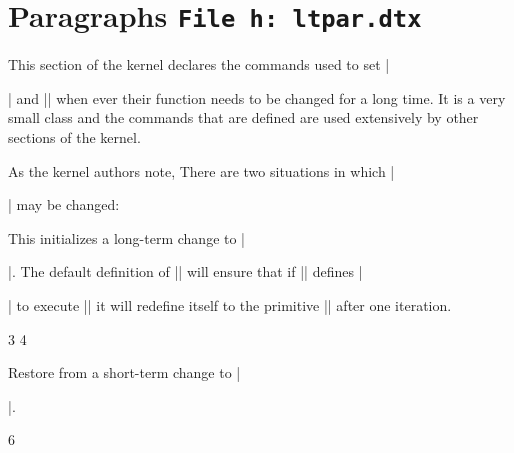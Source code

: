 \chapter{Paragraphs \texttt{File h: ltpar.dtx}}


This section of the kernel declares the commands used to set |\par| and |\everypar|
when ever their function needs to be changed for a long time. It is a very small class
and the commands that are defined are used extensively by other sections of the kernel.

As the kernel authors note, There are two situations in which |\par| may be changed:


 This initializes a long-term change to |\par|. The default definition of |\@par| will ensure that if |\@restorepar| defines |\par|
to execute |\@par| it will redefine itself to the primitive |\@@par| after one iteration.

\begin{teX}
3 \def\@setpar#1{\def\par{#1}\def\@par{#1}}
4 \def\@par{\let\par\@@par\par}
\end{teX}

 Restore from a short-term change to |\par|.

\begin{teX}
6 \def\@restorepar{\def\par{\@par}}
\end{teX}

